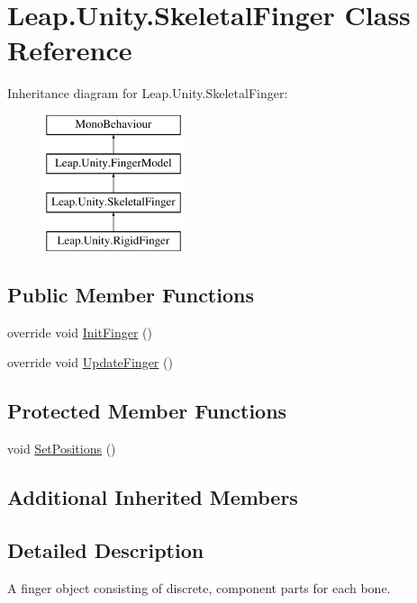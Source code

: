 \hypertarget{class_leap_1_1_unity_1_1_skeletal_finger}{}\section{Leap.\+Unity.\+Skeletal\+Finger Class Reference}
\label{class_leap_1_1_unity_1_1_skeletal_finger}
Inheritance diagram for Leap.\+Unity.\+Skeletal\+Finger\+:\begin{figure}[H]
\begin{center}
\leavevmode
\includegraphics[height=4.000000cm]{class_leap_1_1_unity_1_1_skeletal_finger}
\end{center}
\end{figure}
\subsection*{Public Member Functions}
\begin{DoxyCompactItemize}
\item 
override void \mbox{\hyperlink{class_leap_1_1_unity_1_1_skeletal_finger_a1d595125b2ac26548297c23e4937ca03}{Init\+Finger}} ()
\item 
override void \mbox{\hyperlink{class_leap_1_1_unity_1_1_skeletal_finger_a8b622787258cd44d6cd4e20e8cb2a6a7}{Update\+Finger}} ()
\end{DoxyCompactItemize}
\subsection*{Protected Member Functions}
\begin{DoxyCompactItemize}
\item 
void \mbox{\hyperlink{class_leap_1_1_unity_1_1_skeletal_finger_a41c13da1e39f9c79c45bfe6c4cfeeca1}{Set\+Positions}} ()
\end{DoxyCompactItemize}
\subsection*{Additional Inherited Members}


\subsection{Detailed Description}
A finger object consisting of discrete, component parts for each bone.

